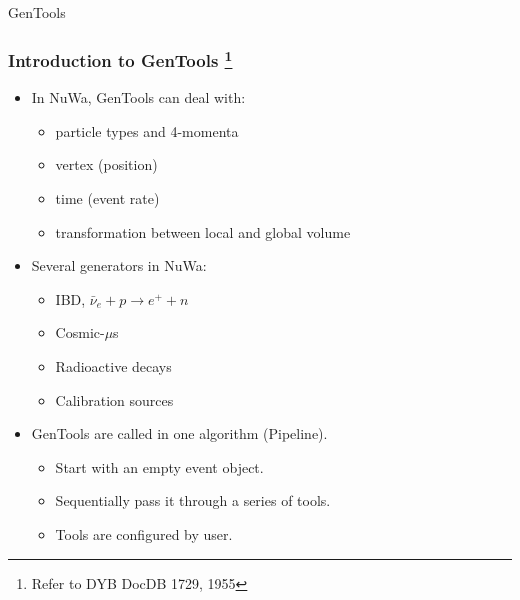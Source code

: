 \begin{frame}
    \begin{center}
        \LARGE GenTools
    \end{center}
\end{frame}

\begin{frame}
    \frametitle{Introduction to GenTools
                \footnote{Refer to DYB DocDB 1729, 1955}}
    \begin{itemize}
        \item In NuWa, GenTools can deal with:
            \begin{itemize}
                \item particle types and 4-momenta
                \item vertex (position)
                \item time (event rate)
                \item transformation between local and global volume
            \end{itemize}
        \item Several generators in NuWa:
            \begin{itemize}
                \item IBD, $\bar{\nu}_e + p \longrightarrow e^{+} + n$
                \item Cosmic-$\mu$s
                \item Radioactive decays
                \item Calibration sources
            \end{itemize}
        \item GenTools are called in one algorithm (Pipeline).
            \begin{itemize}
                \item Start with an empty event object.
                \item Sequentially pass it through a series of tools.
                \item Tools are configured by user.
            \end{itemize}
    \end{itemize}
\end{frame}

